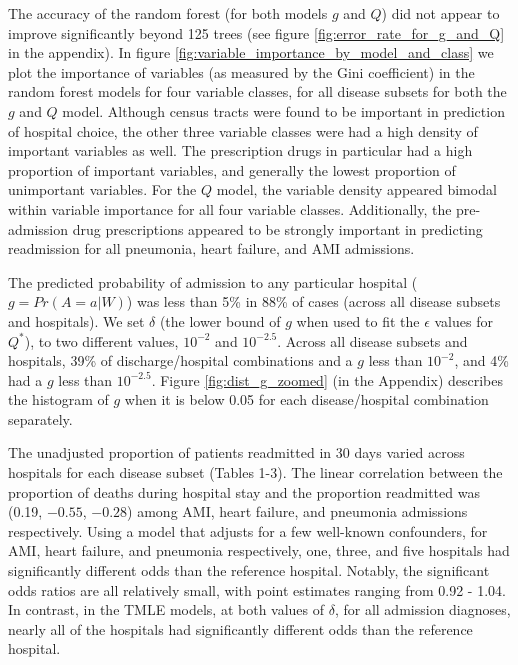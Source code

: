 \documentclass[]{article}\usepackage[]{graphicx}\usepackage[]{color}
\begin{document}
The accuracy of the random forest (for both models $g$ and $Q$) did not appear to improve significantly beyond 125 trees (see figure \ref{fig:error_rate_for_g_and_Q} in the appendix). In figure \ref{fig:variable_importance_by_model_and_class} we plot the importance of variables (as measured by the Gini coefficient) in the random forest models for four variable classes, for all disease subsets for both the $g$ and $Q$ model. Although census tracts were found to be important in prediction of hospital choice,  the other three variable classes were had a high density of important variables as well. The prescription drugs in particular had a high proportion of important variables, and generally the lowest proportion of unimportant variables. For the $Q$ model, the variable density appeared bimodal within variable importance for all four variable classes. Additionally, the pre-admission drug prescriptions appeared to be strongly important in predicting readmission for all pneumonia, heart failure, and AMI admissions.

The predicted probability of admission to any particular hospital ($g=Pr(A=a|W)$) was less than 5\% in 88\% of cases (across all disease subsets and hospitals).  We set $\delta$ (the lower bound of $g$ when used to fit the $\epsilon$ values for $Q^*$), to two different values, $10^{-2}$ and $10^{-2.5}$. Across all disease subsets and hospitals, 39\% of discharge/hospital combinations and a $g$ less than $10^{-2}$, and 4\% had a $g$ less than $10^{-2.5}$. Figure \ref{fig:dist_g_zoomed} (in the Appendix) describes the histogram of $g$ when it is below 0.05 for each disease/hospital combination separately.

The unadjusted proportion of patients readmitted in 30 days varied across hospitals for each disease subset (Tables 1-3). The linear correlation between the proportion of deaths during hospital stay and the proportion readmitted was (0.19, \ensuremath{-0.55}, \ensuremath{-0.28}) among AMI, heart failure, and pneumonia admissions respectively. Using a model that adjusts for a few well-known confounders, for AMI, heart failure, and pneumonia respectively, one, three, and five hospitals had significantly different odds than the reference hospital. Notably, the significant odds ratios are all relatively small, with point estimates ranging from 0.92 - 1.04. In contrast, in the TMLE models, at both values of $\delta$, for all admission diagnoses, nearly all of the hospitals had significantly different odds than the reference hospital.
\end{document}
